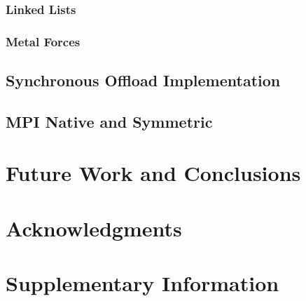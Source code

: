 \documentclass[fleqn,12pt,onecolumn]{ipcc} %
\begin{document}
\subsubsection{Linked Lists}

\subsubsection{Metal Forces}

\subsection{Synchronous Offload Implementation}
\label{sec:offload}

\subsection{MPI Native and Symmetric}
\label{sec:mpis}


\section{Future Work and Conclusions}

\section*{Acknowledgments} %





\section*{Supplementary Information} %

\end{document}
